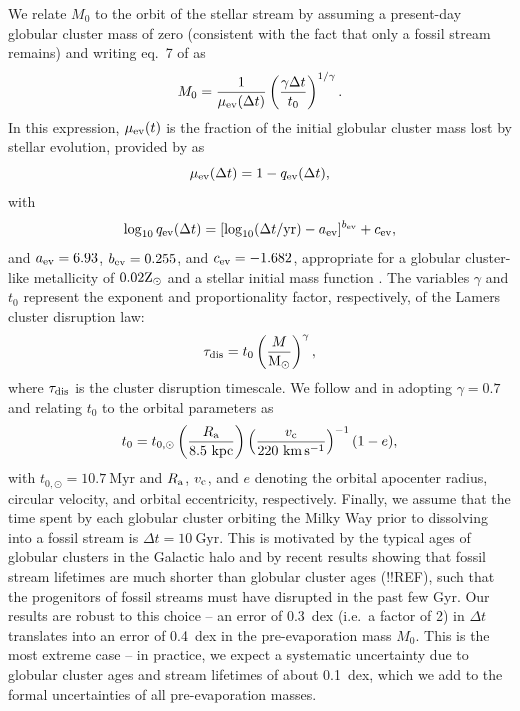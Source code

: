 \documentclass[twocolumn]{aastex63}
\newcommand{\msun}{\ensuremath{\textrm{M}_\odot}}
\newcommand{\myr}{\ensuremath{\textrm{Myr}}}
\newcommand{\gyr}{\ensuremath{\textrm{Gyr}}}
\newcommand{\kpc}{\ensuremath{\textrm{kpc}}}
\newcommand{\kms}{\ensuremath{\textrm{km}\,\textrm{s}^{-1}}}
\begin{document}
We relate $M_0$ to the orbit of the stellar stream by assuming a present-day globular cluster mass of zero (consistent with the fact that only a fossil stream remains) and writing eq.~7 of \citet{lamers05} as
\begin{equation}
\label{eq:m0}
M_{\rm 0}=\frac{1}{\mu_{\rm ev}(\Delta t)}\left(\frac{\gamma \Delta t}{t_0}\right)^{1/\gamma} .
\end{equation}
In this expression, $\mu_{\rm ev}(t)$ is the fraction of the initial globular cluster mass lost by stellar evolution, provided by \citet{lamers05} as
\begin{equation}
\label{eq:muev}
\mu_{\rm ev}(\Delta t)=1-q_{\rm ev}(\Delta t) ,
\end{equation}
with
\begin{equation}
\label{eq:qev}
\log_{10}{q_{\rm ev}}(\Delta t) = [\log_{10}(\Delta t/{\rm yr})-a_{\rm ev}]^{b_{\rm ev}}+c_{\rm ev} ,
\end{equation}
and $a_{\rm ev} = 6.93$, $b_{\rm ev} = 0.255$, and $c_{\rm ev} = -1.682$, appropriate for a globular cluster-like metallicity of $0.02{\rm Z}_\odot$ and a \citet{kroupa01} stellar initial mass function \citep{kruijssen08}. The variables $\gamma$ and $t_0$ represent the exponent and proportionality factor, respectively, of the Lamers cluster disruption law:
\begin{equation}
\label{eq:lamers}
\tau_{\rm dis}=t_0\left(\frac{M}{\msun}\right)^\gamma ,
\end{equation}
where $\tau_{\rm dis}$ is the cluster disruption timescale. We follow \citet{kruijssen09} and \citet{lamers:2010} in adopting $\gamma=0.7$ and relating $t_0$ to the orbital parameters as
\begin{equation}
\label{eq:t0}
t_0 = t_{0,\odot}\left(\frac{R_{\rm a}}{8.5~\kpc}\right)\left(\frac{v_{\rm c}}{220~\kms}\right)^{-1}(1-e) ,
\end{equation}
with $t_{0,\odot}=10.7~\myr$ and $R_{\rm a}$, $v_{\rm c}$, and $e$ denoting the orbital apocenter radius, circular velocity, and orbital eccentricity, respectively. Finally, we assume that the time spent by each globular cluster orbiting the Milky Way prior to dissolving into a fossil stream is $\Delta t=10~\gyr$. This is motivated by the typical ages of globular clusters in the Galactic halo \citep[$\sim12~\gyr$, e.g.][]{kruijssen19e} and by recent results showing that fossil stream lifetimes are much shorter than globular cluster ages (!!REF), such that the progenitors of fossil streams must have disrupted in the past few Gyr. Our results are robust to this choice -- an error of 0.3~dex (i.e.\ a factor of 2) in $\Delta t$ translates into an error of 0.4~dex in the pre-evaporation mass $M_0$. This is the most extreme case -- in practice, we expect a systematic uncertainty due to globular cluster ages and stream lifetimes of about 0.1~dex, which we add to the formal uncertainties of all pre-evaporation masses.
\end{document}
